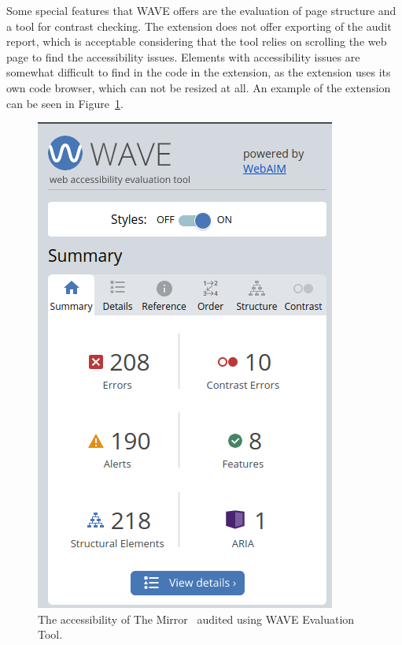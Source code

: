 Some special features that WAVE offers are the evaluation of page structure and a tool for contrast checking.
The extension does not offer exporting of the audit report, which is acceptable considering that the tool relies on scrolling the web page to find the accessibility issues.
Elements with accessibility issues are somewhat difficult to find in the code in the extension, as the extension uses its own code browser, which can not be resized at all. An example of the extension can be seen in Figure~\ref{fig:wave-ext}.

\begin{figure}[tp]
\centering
\includegraphics[keepaspectratio,width=\linewidth,height=\halfh]
{images/wave-ext.png}

\caption[WAVE Evaluation Tool]{
  The accessibility of The Mirror~\parencite{MirrorUK} audited using WAVE Evaluation Tool.
}
\label{fig:wave-ext}
\end{figure}


